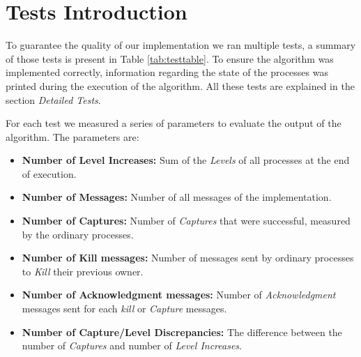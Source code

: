 \section*{Tests Introduction}

	\vspace{10pt}

	\indent To guarantee the quality of our implementation we ran multiple tests, a summary of those tests is present in Table \ref{tab:testtable}. To ensure the algorithm was implemented correctly, information regarding the state of the processes was printed during the execution of the algorithm. All these tests are explained in the section \textit{Detailed Tests}.

	For each test we measured a series of parameters to evaluate the output of the algorithm. The parameters are:

	\begin{itemize}
		\item{\textbf{Number of Level Increases:}} Sum of the \textit{Levels} of all processes at the end of execution. 
		\item{\textbf{Number of Messages:}} Number of all messages of the implementation.
		\item{\textbf{Number of Captures:}} Number of \textit{Captures} that were successful, measured by the ordinary processes.
		\item{\textbf{Number of Kill messages:}} Number of messages sent by ordinary processes to \textit{Kill} their previous owner.
		\item{\textbf{Number of Acknowledgment messages:}} Number of \textit{Acknowledgment} messages sent for each \textit{kill} or \textit{Capture} messages.
		\item{\textbf{Number of Capture/Level Discrepancies:}} The difference between the number of \textit{Captures} and number of \textit{Level Increases}.

	\end{itemize}

